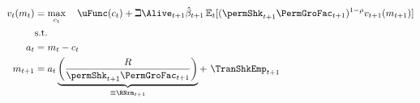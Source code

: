   \begin{equation*}\begin{gathered}\begin{aligned}
        \vFunc_{\prd}(m_{\prd})  & = \max_{{c}_{\prd}}~~~ \uFunc(c_{\prd})+\beth\Alive_{\prd+1}\hat{\DiscFac}_{\prd+1}
        \Ex_{\prd}[(\permShk_{\prd+1}\PermGroFac_{\prd+1})^{1-\CRRA}\vFunc_{\prd+1}(m_{\prd+1})]   \\
        & \text{s.t.}   \nonumber \\
        a_{\prd}    & = m_{\prd}-c_{\prd} \nonumber
        \\      m_{\prd+1}  & = a_{\prd}\underbrace{\left(\frac{\Rfree}{\permShk_{\prd+1}\PermGroFac_{\prd+1}}\right)}_{\equiv \RNrm_{\prd+1}}+ ~\TranShkEmp_{\prd+1}
      \end{aligned}\end{gathered}\end{equation*}
